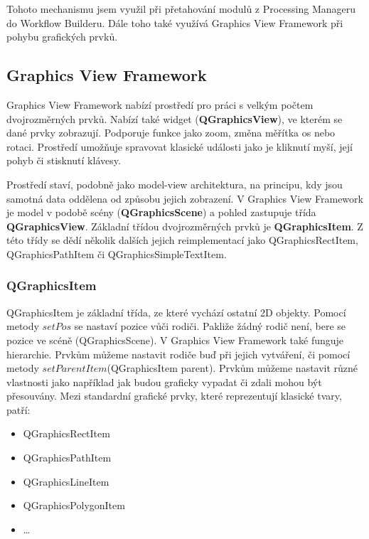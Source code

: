 Tohoto mechanismu jsem využil při přetahování modulů z Processing
Manageru do Workflow Builderu. Dále toho také využívá Graphics View
Framework při pohybu grafických prvků.

\subsection{Graphics View Framework}
Graphics View Framework nabízí prostředí pro práci s velkým počtem
dvojrozměrných prvků. Nabízí také widget (\textbf{QGraphicsView}), ve
kterém se dané prvky zobrazují. Podporuje funkce jako zoom, změna
měřítka os nebo rotaci. Prostředí umožňuje spravovat klasické události
jako je kliknutí myší, její pohyb či stisknutí klávesy.

Prostředí staví, podobně jako model-view architektura, na principu,
kdy jsou samotná data oddělena od způsobu jejich zobrazení. V Graphics
View Framework je model v podobě scény (\textbf{QGraphicsScene}) a
pohled zastupuje třída \textbf{QGraphicsView}. Základní třídou
dvojrozměrných prvků je \textbf{QGraphicsItem}. Z této třídy se dědí
několik dalších jejich reimplementací jako QGraphicsRectItem,
QGraphicsPathItem či QGraphicsSimpleTextItem.

\subsubsection*{QGraphicsItem}
QGraphicsItem je základní třída, ze které vychází ostatní 2D
objekty. Pomocí metody $setPos$ se nastaví pozice vůči rodiči. Pakliže
žádný rodič není, bere se pozice ve scéně (QGraphicsScene). V Graphics
View Framework také funguje hierarchie. Prvkům můžeme nastavit rodiče
buď při jejich vytváření, či pomocí metody
$setParentItem$(QGraphicsItem parent). Prvkům můžeme nastavit různé
vlastnosti jako například jak budou graficky vypadat či zdali mohou
být přesouvány. Mezi standardní grafické prvky, které reprezentují
klasické tvary, patří:\\
\begin{itemize}
	\item QGraphicsRectItem
	\item QGraphicsPathItem
	\item QGraphicsLineItem
	\item QGraphicsPolygonItem
	\item \ldots
\end{itemize}
 
